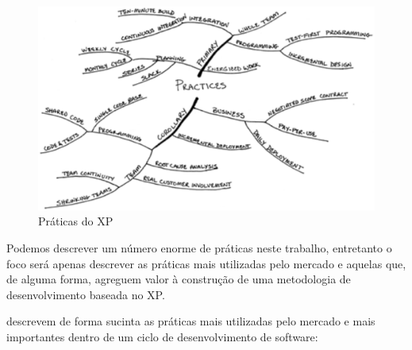 \begin{figure}[ht]
	\centering
	\includegraphics[keepaspectratio=true,scale=0.5]{figuras/fig02.eps}
	\caption{Práticas do XP \cite{Beck:2004}}
	\label{fig02}
\end{figure}

Podemos descrever um número enorme de práticas neste trabalho, entretanto o foco será apenas descrever as práticas mais utilizadas pelo mercado e aquelas que, de alguma forma, agreguem valor à construção de uma metodologia de desenvolvimento baseada no XP.

\cite{Maurer:2002} descrevem de forma sucinta as práticas mais utilizadas pelo mercado e mais importantes dentro de um ciclo de desenvolvimento de software:


